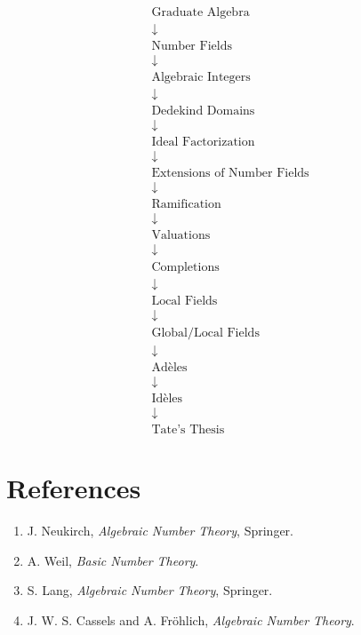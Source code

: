 \documentclass[11pt]{article}
\begin{document}
\[
\begin{array}{c}
\text{Graduate Algebra}
\\[4pt]
\downarrow
\\[4pt]
\text{Number Fields}
\\
\downarrow
\\
\text{Algebraic Integers}
\\
\downarrow
\\
\text{Dedekind Domains}
\\
\downarrow
\\
\text{Ideal Factorization}
\\
\downarrow
\\
\text{Extensions of Number Fields}
\\
\downarrow
\\
\text{Ramification}
\\
\downarrow
\\
\text{Valuations}
\\
\downarrow
\\
\text{Completions}
\\
\downarrow
\\
\text{Local Fields}
\\
\downarrow
\\
\text{Global/Local Fields}
\\
\downarrow
\\
\text{Adèles}
\\
\downarrow
\\
\text{Idèles}
\\
\downarrow
\\
\text{Tate's Thesis}
\end{array}
\]

\section{References}

\begin{enumerate}
    \item J. Neukirch,
    \emph{Algebraic Number Theory},
    Springer.

    \item A. Weil,
    \emph{Basic Number Theory}.

    \item S. Lang,
    \emph{Algebraic Number Theory},
    Springer.

    \item J. W. S. Cassels and A. Fr\"ohlich,
    \emph{Algebraic Number Theory}.
\end{enumerate}
\end{document}

